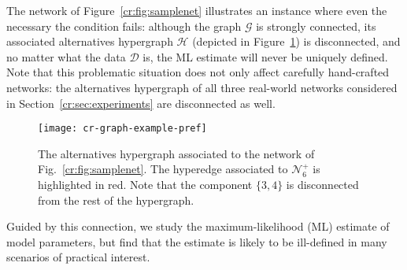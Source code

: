 The network of Figure~\ref{cr:fig:samplenet} illustrates an instance where even the necessary the condition fails:
although the graph $\mathcal{G}$ is strongly connected, its associated alternatives hypergraph $\mathcal{H}$ (depicted in Figure~\ref{cr:fig:samplehyp}) is disconnected, and no matter what the data $\mathcal{D}$ is, the ML estimate will never be uniquely defined.
Note that this problematic situation does not only affect carefully hand-crafted networks: the alternatives hypergraph of all three real-world networks considered in Section~\ref{cr:sec:experiments} are disconnected as well.

\begin{figure}
  \centering
  \texttt{[image: cr-graph-example-pref]}
  \caption{The alternatives hypergraph associated to the network of Fig.~\ref{cr:fig:samplenet}.
The hyperedge associated to $\mathcal{N}^+_6$ is highlighted in red.
Note that the component $\{3, 4\}$ is disconnected from the rest of the hypergraph.}
  \label{cr:fig:samplehyp}
\end{figure}

Guided by this connection, we study the maximum-likelihood (ML) estimate of model parameters, but find that the estimate is likely to be ill-defined in many scenarios of practical interest.

